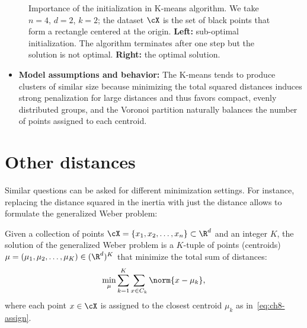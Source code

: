 \begin{figure}[h]\centering
\caption{Importance of the initialization in K-means algorithm. We take $n=4$,
$d=2$, $k=2$; the dataset $\cX$ is the set of black points that form a
rectangle centered at the origin. \textbf{Left:} sub-optimal initialization.
The algorithm terminates after one step but the solution is not optimal.
\textbf{Right:} the optimal solution.}
\label{fig:ch8-init}
\end{figure}

\begin{itemize}
    \item \textbf{Model assumptions and behavior:} The K-means tends to produce
    clusters of similar size because minimizing the total squared distances
    induces strong penalization for large distances and thus favors compact,
    evenly distributed groups, and the Voronoi partition naturally balances
    the number of points assigned to each centroid.
\end{itemize}

\section{Other distances}

Similar questions can be asked for different minimization settings. For instance,
replacing the distance squared in the inertia with just the distance allows to
formulate the generalized Weber problem:

\begin{definition}
Given a collection of points $\cX = \{x_1, x_2, \ldots, x_n\} \subset \R^d$
and an integer $K$, the solution of the generalized Weber problem is a
$K$-tuple of points (centroids) $\mu = (\mu_1, \mu_2, \ldots, \mu_K)
\in (\R^d)^K$ that minimize the total sum of distances:
\begin{equation}\label{eq:ch8-weber}
\min_{\mu} \sum_{k=1}^{K} \sum_{x \in C_k} \norm{x - \mu_k},
\end{equation}
where each point $x \in \cX$ is assigned to the closest centroid $\mu_k$ as
in~\eqref{eq:ch8-assign}.
\end{definition}

